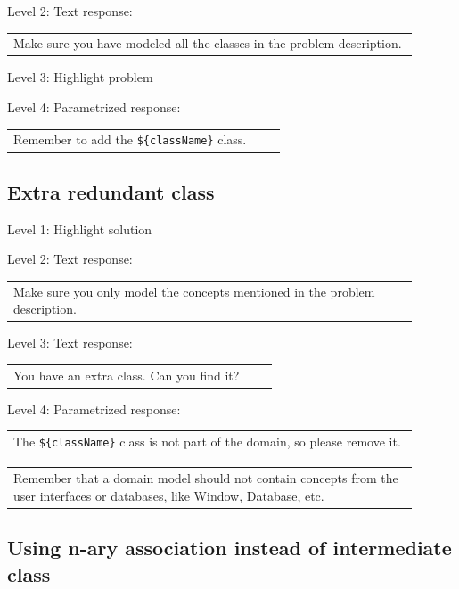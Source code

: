 \noindent Level 2: Text response: \medskip

\begin{tabular}{|p{0.9\linewidth}}
Make sure you have modeled all the classes in the problem description.
\end{tabular} \medskip

\noindent Level 3: Highlight problem \medskip

\noindent Level 4: Parametrized response: \medskip

\begin{tabular}{|p{0.9\linewidth}}
Remember to add the \verb|${className}| class.
\end{tabular} \medskip


\subsection{Extra redundant class}

\noindent Level 1: Highlight solution \medskip

\noindent Level 2: Text response: \medskip

\begin{tabular}{|p{0.9\linewidth}}
Make sure you only model the concepts mentioned in the problem description.
\end{tabular} \medskip

\noindent Level 3: Text response: \medskip

\begin{tabular}{|p{0.9\linewidth}}
You have an extra class. Can you find it?
\end{tabular} \medskip

\noindent Level 4: Parametrized response: \medskip

\begin{tabular}{|p{0.9\linewidth}}
The \verb|${className}| class is not part of the domain, so please remove it.
\end{tabular} \medskip

\begin{tabular}{|p{0.9\linewidth}}
Remember that a domain model should not contain concepts from the user interfaces or databases, like Window, Database, etc.
\end{tabular} \medskip


\subsection{Using n-ary association instead of intermediate class}

